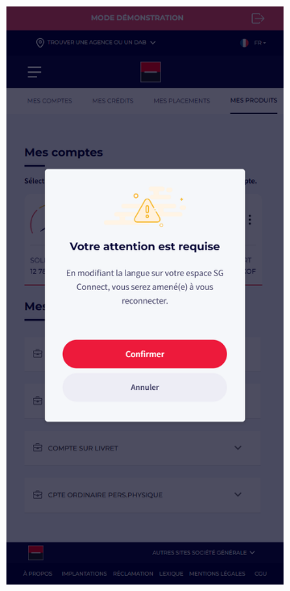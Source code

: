 \begin{figure}[!ht]
    \centering
    \begin{subfigure}[b]{0.49\textwidth}
        \centering
        \includegraphics[width=\textwidth]{images/screens/switch/mob-fr.png}

\end{subfigure}
\end{figure}
